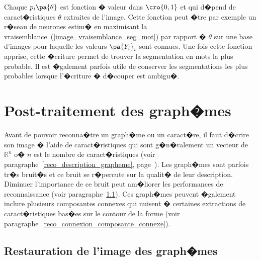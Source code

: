 
Chaque $p_i\pa{\theta}$ est fonction � valeur dans $\cro{0,1}$ et qui d�pend de caract�ristiques $\theta$ extraites de l'image. Cette fonction peut �tre par exemple un r�seau de neurones estim� en maximisant la vraisemblance~(\ref{image_vraisemblance_seg_mot}) par rapport � $\theta$ sur une base d'images pour laquelle les valeurs $\pa{Y_i}_i$ sont connues. Une fois cette fonction apprise, cette �criture permet de trouver la segmentation en mots la plus probable. Il est �galement parfois utile de conserver les segmentations les plus probables lorsque l'�criture � d�couper est ambigu�.









\section{Post-traitement des graph�mes}


Avant de pouvoir reconna�tre un graph�me ou un caract�re, il faut d�crire son image � l'aide de caract�ristiques qui sont g�n�ralement un vecteur de $\mathbb{R}^n$ o� $n$ est le nombre de caract�ristiques (voir paragraphe~\ref{reco_description_grapheme}, page~\pageref{reco_description_grapheme}). Les graph�mes sont parfois tr�s bruit�s et ce bruit se r�percute sur la qualit� de leur description. Diminuer l'importance de ce bruit peut am�liorer les performances de reconnaissance (voir paragraphe~\ref{reco_restauration_image_graheme}). Ces graph�mes peuvent �galement inclure plusieurs composantes connexes qui nuisent � certaines extractions de caract�ristiques bas�es sur le contour de la forme (voir paragraphe~\ref{reco_connexion_composante_connexe}).









\subsection{Restauration de l'image des graph�mes}
\label{reco_restauration_image_graheme}


